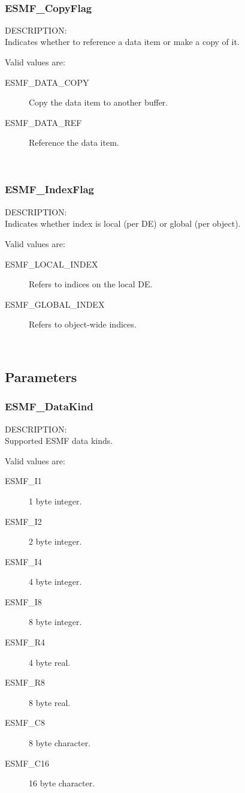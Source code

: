 \mbox{}\hrulefill\

\subsubsection{ESMF\_CopyFlag}

{\sf DESCRIPTION:\\}
Indicates whether to reference a data item or make a copy of it.

Valid values are:
\begin{description}
\item [ESMF\_DATA\_COPY]
      Copy the data item to another buffer.
\item [ESMF\_DATA\_REF]
      Reference the data item.
\end{description}

\mbox{}\hrulefill\

\subsubsection{ESMF\_IndexFlag}

{\sf DESCRIPTION:\\}
Indicates whether index is local (per DE) or global (per object).

Valid values are:
\begin{description}
\item [ESMF\_LOCAL\_INDEX]
      Refers to indices on the local DE.
\item [ESMF\_GLOBAL\_INDEX]
      Refers to object-wide indices.
\end{description}

\mbox{}\hrulefill\

\subsection{Parameters}

\subsubsection{ESMF\_DataKind}

{\sf DESCRIPTION:\\}
Supported ESMF data kinds.

Valid values are:
\begin{description}
\item [ESMF\_I1]
      1 byte integer.
\item [ESMF\_I2]
      2 byte integer.
\item [ESMF\_I4]
      4 byte integer.
\item [ESMF\_I8]
      8 byte integer.
\item [ESMF\_R4]
      4 byte real.
\item [ESMF\_R8]
      8 byte real.
\item [ESMF\_C8]
      8 byte character.
\item [ESMF\_C16]
      16 byte character.
\end{description}

